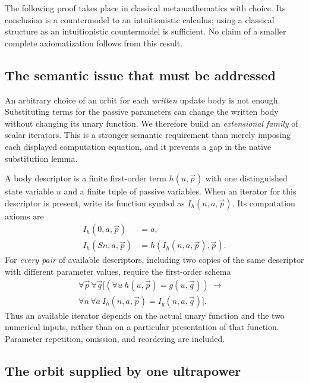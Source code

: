 \documentclass[11pt,letterpaper]{article}
\theoremstyle{definition}
\begin{document}
The following proof takes place in classical metamathematics with choice.
Its conclusion is a countermodel to an intuitionistic calculus; using a
classical structure as an intuitionistic countermodel is sufficient.
No claim of a smaller complete axiomatization follows from this result.

\subsection{The semantic issue that must be addressed}

An arbitrary choice of an orbit for each \emph{written} update body is not
enough. Substituting terms for the passive parameters can change the written
body without changing its unary function. We therefore build an
\emph{extensional family} of scalar iterators. This is a stronger semantic
requirement than merely imposing each displayed computation equation, and
it prevents a gap in the native substitution lemma.

A body descriptor is a finite first-order term $h(u,\vec p)$ with one
distinguished state variable $u$ and a finite tuple of passive variables.
When an iterator for this descriptor is present, write its function symbol
as $I_h(n,a,\vec p)$. Its computation axioms are
\begin{align}
 I_h(0,a,\vec p)&=a,\label{eq:audit-c0}\\
 I_h(Sn,a,\vec p)&=h(I_h(n,a,\vec p),\vec p).
 \label{eq:audit-cs}
\end{align}
For \emph{every pair} of available descriptors, including two copies of the
same descriptor with different parameter values, require the first-order
schema
\begin{equation}
\begin{split}
 \forall\vec p\,\forall\vec q\bigl[
  (\forall u\ h(u,\vec p)=g(u,\vec q))\ \longrightarrow {}&\\[-0.6em]
  \forall n\,\forall a\ I_h(n,a,\vec p)=I_g(n,a,\vec q)
 \bigr].&
\end{split}
\tag{Ext}\label{eq:audit-ext}
\end{equation}
Thus an available iterator depends on the actual unary function and the
two numerical inputs, rather than on a particular presentation of that
function. Parameter repetition, omission, and reordering are included.

\subsection{The orbit supplied by one ultrapower}
\end{document}
